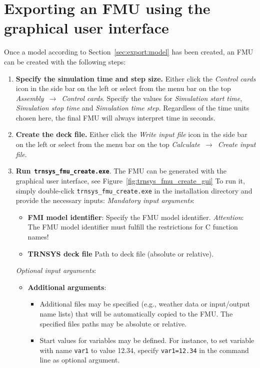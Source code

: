 \clearpage

\section{Exporting an FMU using the graphical user interface}
\label{sec:export:gui}

Once a \trnsys model according to Section~\ref{sec:export:model} has been created, an FMU can be created with the following steps:
\begin{enumerate}
  \item \textbf{Specify the simulation time and step size.} Either click the \textit{Control cards} icon in the side bar on the left or select from the menu bar on the top \textit{Assembly}~$\rightarrow$~\textit{Control cards}. 
  Specify the values for \textit{Simulation start time}, \textit{Simulation stop time} and \textit{Simulation time step}.
  Regardless of the time units chosen here, the final FMU will always interpret time in seconds.
  \item \textbf{Create the deck file.} Either click the \textit{Write input file} icon in the side bar on the left or select from the menu bar on the top \textit{Calculate}~$\rightarrow$~\textit{Create input file}.
  \item \textbf{Run}~\textbf{\texttt{trnsys\_fmu\_create.exe}}.
  The FMU can be generated with the graphical user interface, see Figure~\ref{fig:trnsys_fmu_create_gui}
  To run it, simply double-click \texttt{trnsys\_fmu\_create.exe} in the installation directory and provide the necessary inputs:
  \textit{Mandatory input arguments}:
  \begin{itemize}
    \item \textbf{FMI model identifier}: Specify the FMU model identifier. 
    \emph{Attention}: The FMU model identifier must fulfill the restrictions for C function names!
    \item \textbf{TRNSYS deck file} Path to \trnsys deck file (absolute or relative).
  \end{itemize}
  \textit{Optional input arguments}:
  \begin{itemize}
    \item \textbf{Additional arguments}:
    \begin{itemize}
      \item Additional files may be specified (e.g., weather data or input/output name lists) that will be automatically copied to the FMU. The specified files paths may be absolute or relative.
      \item Start values for variables may be defined. For instance, to set variable with name \verb!var1! to value 12.34, specify \verb!var1=12.34! in the command line as optional argument.

\end{itemize}
\end{itemize}
\end{enumerate}
